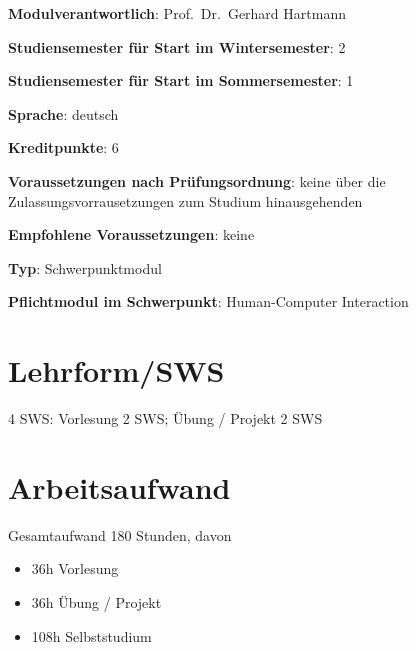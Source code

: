 \begin{modulHead}
\textbf{Modulverantwortlich}: Prof.~Dr.~Gerhard
Hartmann
\end{modulHead}
\begin{modulHead}
\textbf{Studiensemester für
Start im Wintersemester}:
2
\end{modulHead}
\begin{modulHead}
\textbf{Studiensemester für Start
im Sommersemester}:
1
\end{modulHead}
\begin{modulHead}
\textbf{Sprache}:
deutsch
\end{modulHead}
\begin{modulHead}
\textbf{Kreditpunkte}:
6
\end{modulHead}
\begin{modulHead}
\textbf{Voraussetzungen nach
Prüfungsordnung}: keine über die Zulassungsvorrausetzungen zum Studium
hinausgehenden
\end{modulHead}
\begin{modulHead}
\textbf{Empfohlene
Voraussetzungen}: keine
\end{modulHead}
\begin{modulHead}
\textbf{Typ}:
Schwerpunktmodul
\end{modulHead}
\begin{modulHead}
\textbf{Pflichtmodul
im Schwerpunkt}: Human-Computer Interaction
\end{modulHead}


\section*{Lehrform/SWS\label{/mi-2017/modulbeschreibungen-master/MA_HCI_Modul_Statistical_Methods_for_HCI}}\label{lehrformswspathlabelmi-2017modulbeschreibungen-mastermaux5fhciux5fmodulux5fstatisticalux5fmethodsux5fforux5fhci}

4 SWS: Vorlesung 2 SWS; Übung / Projekt 2 SWS

\section*{Arbeitsaufwand\label{/mi-2017/modulbeschreibungen-master/MA_HCI_Modul_Statistical_Methods_for_HCI}}\label{arbeitsaufwandpathlabelmi-2017modulbeschreibungen-mastermaux5fhciux5fmodulux5fstatisticalux5fmethodsux5fforux5fhci}

Gesamtaufwand 180 Stunden, davon

\begin{itemize}
\tightlist
\item
  36h Vorlesung
\item
  36h Übung / Projekt
\item
  108h Selbststudium
\end{itemize}

